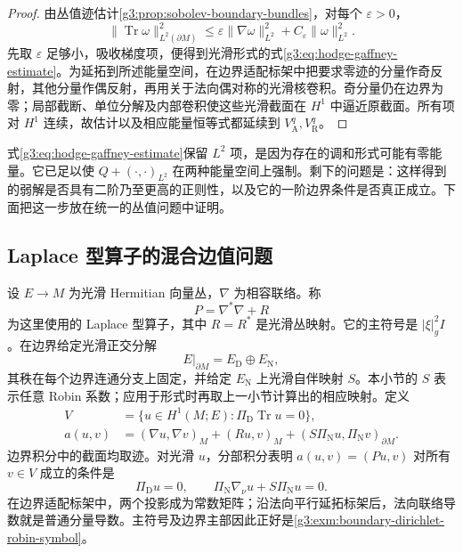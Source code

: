 \begin{proof}
	由丛值迹估计\cref{g3:prop:sobolev-boundary-bundles}，对每个 \(\varepsilon>0\)，
	\[
		\|\operatorname{Tr}\omega\|_{L^2(\partial M)}^2
		\le\varepsilon\|\nabla\omega\|_{L^2}^2+C_\varepsilon\|\omega\|_{L^2}^2.
	\]
	先取 \(\varepsilon\) 足够小，吸收梯度项，便得到光滑形式的式\eqref{g3:eq:hodge-gaffney-estimate}。为延拓到所述能量空间，在边界适配标架中把要求零迹的分量作奇反射，其他分量作偶反射，再用关于法向偶对称的光滑核卷积。奇分量仍在边界为零；局部截断、单位分解及内部卷积使这些光滑截面在 \(H^1\) 中逼近原截面。所有项对 \(H^1\) 连续，故估计以及相应能量恒等式都延续到 \(V_{\mathrm A}^q,V_{\mathrm R}^q\)。
\end{proof}

式\eqref{g3:eq:hodge-gaffney-estimate}保留 \(L^2\) 项，是因为存在的调和形式可能有零能量。它已足以使 \(Q+(\cdot,\cdot)_{L^2}\) 在两种能量空间上强制。剩下的问题是：这样得到的弱解是否具有二阶乃至更高的正则性，以及它的一阶边界条件是否真正成立。下面把这一步放在统一的丛值问题中证明。

\subsection{Laplace 型算子的混合边值问题}
\label{g3:subsec:1403:04}
设 \(E\to M\) 为光滑 Hermitian 向量丛，\(\nabla\) 为相容联络。称
\[
	P=\nabla^*\nabla+R
\]
为这里使用的 Laplace 型算子，其中 \(R=R^*\) 是光滑丛映射。它的主符号是 \(|\xi|_g^2I\)。在边界给定光滑正交分解
\[
	E|_{\partial M}=E_{\mathrm D}\oplus E_{\mathrm N},
\]
其秩在每个边界连通分支上固定，并给定 \(E_{\mathrm N}\) 上光滑自伴映射 \(S\)。本小节的 \(S\) 表示任意 Robin 系数；应用于形式时再取上一小节计算出的相应映射。定义
\begin{align}
	V&=\{u\in H^1(M;E):\Pi_{\mathrm D}\operatorname{Tr}u=0\},\label{g3:eq:mixed-bundle-energy-space}\\
	a(u,v)&=(\nabla u,\nabla v)_M+(Ru,v)_M
	+(S\Pi_{\mathrm N}u,\Pi_{\mathrm N}v)_{\partial M}.
	\label{g3:eq:mixed-bundle-energy-form}
\end{align}
边界积分中的截面均取迹。对光滑 \(u\)，分部积分表明 \(a(u,v)=(Pu,v)\) 对所有 \(v\in V\) 成立的条件是
\begin{equation}\label{g3:eq:mixed-bundle-boundary}
	\Pi_{\mathrm D}u=0,\qquad
	\Pi_{\mathrm N}\nabla_\nu u+S\Pi_{\mathrm N}u=0.
\end{equation}
在边界适配标架中，两个投影成为常数矩阵；沿法向平行延拓标架后，法向联络导数就是普通分量导数。主符号及边界主部因此正好是\cref{g3:exm:boundary-dirichlet-robin-symbol}。

